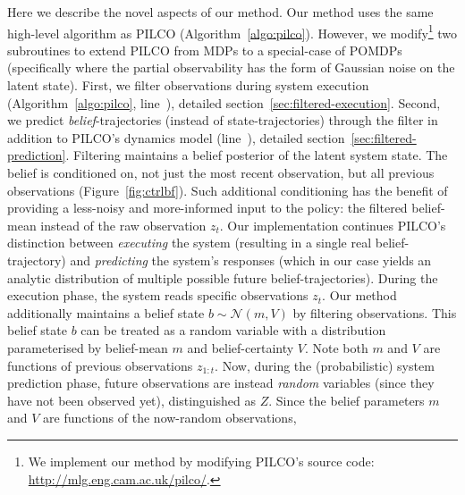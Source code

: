 \documentclass{article}
\newcommand{\N}{\mathcal{N}}
\newcommand{\now}[1]{#1_t}
\begin{document}
Here we describe the novel aspects of our method.
Our method uses the same high-level algorithm as PILCO (Algorithm~\ref{algo:pilco}).
However, we modify\footnote{
We implement our method by modifying PILCO's source code: \url{http://mlg.eng.cam.ac.uk/pilco/}.} two subroutines
to extend PILCO from MDPs to a special-case of POMDPs (specifically where the partial observability has the form of Gaussian noise on the latent state).
First, we filter observations during system execution (Algorithm~\ref{algo:pilco}, line~\lineexecute),
detailed section~\ref{sec:filtered-execution}.
Second, we predict \textit{belief}-trajectories (instead of state-trajectories)
through the filter in addition to PILCO's dynamics model (line~\linepredict),
detailed section~\ref{sec:filtered-prediction}.
Filtering maintains a belief posterior of the latent system state.
The belief %
is conditioned on, not just the most recent observation,
but all previous %
observations (Figure~\ref{fig:ctrlbf}).
Such additional conditioning has the benefit of providing a less-noisy and more-informed input to the policy:
the filtered belief-mean instead of the raw observation $\now{z}$.
%
Our implementation continues PILCO's distinction between
\textit{executing} the system (resulting in a single real belief-trajectory)
and \textit{predicting} the system's responses (which in our case yields
an analytic distribution of multiple possible future belief-trajectories).
During the execution phase,
the system reads specific observations $z_t$.
Our method additionally maintains a belief state $b\sim\N(m,V)$ by filtering observations.
This belief state $b$ can be treated as a random variable with a distribution
parameterised by belief-mean $m$ and belief-certainty $V$.
Note both $m$ and $V$ are functions of previous observations $z_{1:t}$. %
Now, during the (probabilistic) system prediction phase,
future observations are instead \textit{random} variables
(since they have not been observed yet), distinguished as $Z$.
Since the belief parameters $m$ and $V$ are functions of the now-random observations,
\end{document}
